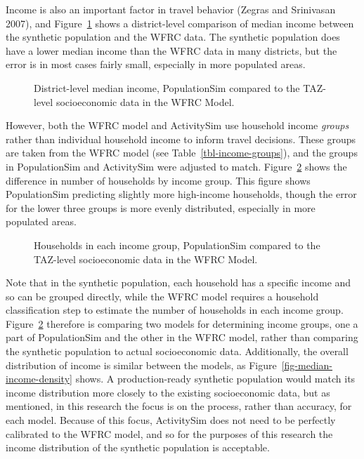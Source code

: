 \documentclass[fancy, oneside, mastersfancy, ms]{byuthesis}
\begin{document}
Income is also an important factor in travel behavior (Zegras and
Srinivasan 2007), and Figure~\ref{fig-median-income-comparison} shows a
district-level comparison of median income between the synthetic
population and the WFRC data. The synthetic population does have a lower
median income than the WFRC data in many districts, but the error is in
most cases fairly small, especially in more populated areas.

\begin{figure}


\caption{\label{fig-median-income-comparison}District-level median
income, PopulationSim compared to the TAZ-level socioeconomic data in
the WFRC Model.}

\end{figure}%

However, both the WFRC model and ActivitySim use household income
\emph{groups} rather than individual household income to inform travel
decisions. These groups are taken from the WFRC model (see
Table~\ref{tbl-income-groups}), and the groups in PopulationSim and
ActivitySim were adjusted to match. Figure~\ref{fig-income-group-map}
shows the difference in number of households by income group. This
figure shows PopulationSim predicting slightly more high-income
households, though the error for the lower three groups is more evenly
distributed, especially in more populated areas.

\begin{figure}


\caption{\label{fig-income-group-map}Households in each income group,
PopulationSim compared to the TAZ-level socioeconomic data in the WFRC
Model.}

\end{figure}%

Note that in the synthetic population, each household has a specific
income and so can be grouped directly, while the WFRC model requires a
household classification step to estimate the number of households in
each income group. Figure~\ref{fig-income-group-map} therefore is
comparing two models for determining income groups, one a part of
PopulationSim and the other in the WFRC model, rather than comparing the
synthetic population to actual socioeconomic data. Additionally, the
overall distribution of income is similar between the models, as
Figure~\ref{fig-median-income-density} shows. A production-ready
synthetic population would match its income distribution more closely to
the existing socioeconomic data, but as mentioned, in this research the
focus is on the process, rather than accuracy, for each model. Because
of this focus, ActivitySim does not need to be perfectly calibrated to
the WFRC model, and so for the purposes of this research the income
distribution of the synthetic population is acceptable.
\end{document}

